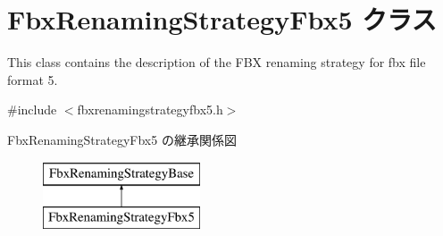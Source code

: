 \hypertarget{class_fbx_renaming_strategy_fbx5}{}\section{Fbx\+Renaming\+Strategy\+Fbx5 クラス}
\label{class_fbx_renaming_strategy_fbx5}


This class contains the description of the F\+BX renaming strategy for fbx file format 5.  




{\ttfamily \#include $<$fbxrenamingstrategyfbx5.\+h$>$}

Fbx\+Renaming\+Strategy\+Fbx5 の継承関係図\begin{figure}[H]
\begin{center}
\leavevmode
\includegraphics[height=2.000000cm]{class_fbx_renaming_strategy_fbx5}
\end{center}
\end{figure}
